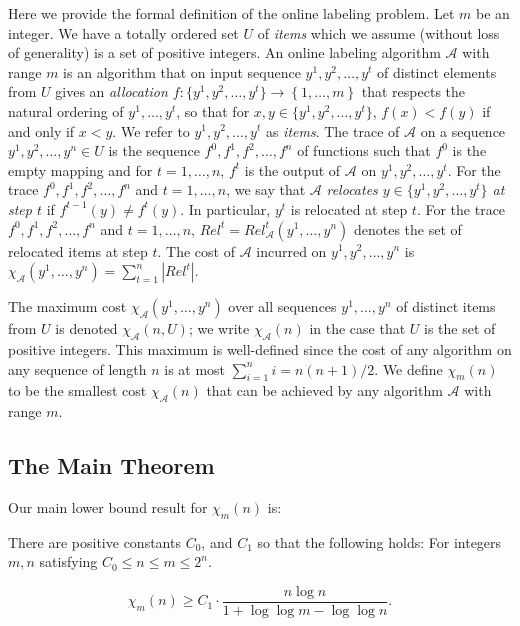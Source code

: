 \documentclass[unicode,review]{siamart1116}
\newcommand{\A}{\mathcal{A}}
\newcommand{\natInt}[2]{ \left\{ #1, \dotsc, #2 \right\} }
\newcommand{\thmA}{{C_0}}
\newcommand{\thmB}{{C_1}}
\numberwithin{theorem}{section}
\begin{document}
Here we provide the formal definition of the online labeling problem.
Let $m$ be an integer. We have a totally ordered set $U$ of {\em items} which we assume (without loss of generality) is
a set of positive integers. 
An online labeling algorithm $\A$ with range $m$ is an algorithm that on input sequence $y^1,y^2,\dotsc,y^t$ of distinct elements
from $U$ gives
an \emph{allocation $f : \{y^1,y^2,\dotsc,y^t\} \rightarrow \natInt{1}{m}$} that respects the natural ordering of $y^1,\dotsc,y^t$, so that
for $x,y\in \{y^1,y^2,\dotsc,y^t\}$, $f(x) < f(y)$ if and only if $x < y$. We refer to $y^1,y^2,\dotsc,y^t$
as \emph{items}. The trace of $\A$ on a sequence $y^1,y^2,\dotsc,y^n\in U$ is the sequence $f^0,f^1,f^2,\dotsc,f^n$ of functions
such that $f^0$ is the empty mapping and for $t=1,\dotsc,n$, $f^t$ is the output of $\A$ on $y^1,y^2,\dotsc,y^t$.
For the trace $f^0,f^1,f^2,\dotsc,f^n$ and $t=1,\dotsc,n$, we say that $\A$ \emph{relocates $y\in \{y^1,y^2,\dotsc,y^t\}$ at step $t$}
if $f^{t-1}(y)\not=f^t(y)$. In particular, $y^t$ is relocated at step $t$.
For the trace $f^0,f^1,f^2,\dotsc,f^n$ and $t=1,\dotsc,n$, $Rel^t=Rel^t_\A(y^1,\ldots,y^n)$  denotes the set of relocated items at step $t$.
The cost of $\A$ incurred on $y^1,y^2,\dotsc,y^n$ is $\chi_\A(y^1,\dotsc,y^n)=\sum_{t=1}^n |Rel^t|$. 

 
The maximum cost
$\chi_\A(y^1,\dotsc,y^n)$ over all sequences $y^1,\dotsc,y^n$ of distinct items from $U$  is denoted $\chi_\A(n,U)$;
we write $\chi_\A(n)$ in the case that $U$ is the set of positive integers.
This maximum  is well-defined since the cost of any algorithm on any sequence of length $n$ is at most $\sum_{i=1}^n i = n(n+1)/2$.    
We define $\chi_m(n)$ to be the smallest cost $\chi_\A(n)$ that
can be achieved by any algorithm $\A$ with range $m$.

\subsection{The Main Theorem}
\label{subsec:main theorem}
Our main lower bound result for  $\chi_m(n)$ is:

\begin{theorem}
\label{thm:main}
There are positive constants $\thmA$, and $\thmB$ so that the following holds: For integers $m,n$ satisfying
$\thmA \leq n \le m \le 2^{n}$.


$$\chi_m(n) \geq   \thmB \cdot \frac{n \log n}{1 + \log \log m - \log \log n}.$$

\end{theorem}
\end{document}
